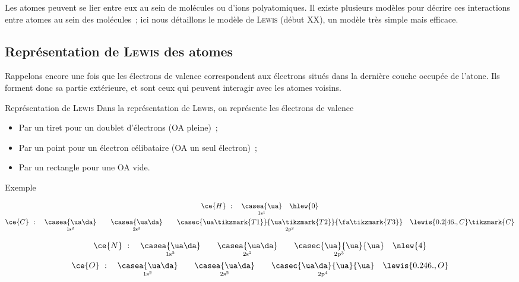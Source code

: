 \documentclass[../main/main.tex]{subfiles}
\begin{document}
Les atomes peuvent se lier entre eux au sein de molécules ou d'ions
polyatomiques. Il existe plusieurs modèles pour décrire ces
interactions entre atomes au sein des molécules~; ici nous détaillons le modèle
de \textsc{Lewis} (début \textsc{XX}\ieme), un modèle très simple mais efficace.

\subsection{Représentation de \textsc{Lewis} des atomes}
Rappelons encore une fois que les électrons de valence correspondent aux
électrons situés dans la dernière couche occupée de l'atone.
Ils forment donc sa partie extérieure, et sont ceux qui peuvent interagir avec
les atomes voisins.

\begin{tdefi}{Représentation de \textsc{Lewis}}
    Dans la représentation de \textsc{Lewis}, on représente les électrons de
    valence
    \begin{itemize}
        \item Par un tiret pour un doublet d'électrons (OA pleine)~;
        \item Par un point pour un électron célibataire (OA un seul électron)~;
        \item Par un rectangle pour une OA vide.
    \end{itemize}
\end{tdefi}

\begin{rexem}{Exemple}
    \begin{minipage}{0.48\linewidth}
        \begin{gather*}
            \ce{H}~:
            \quad
            \underset{\rm 1s^1}{\casea{\ua}}
            \quad
            \hlew{0}
            \\
            \ce{C}~:
            \quad
            \underset{\rm 1s^2}{\casea{\ua\da}}
            \qquad
            \underset{\rm 2s^2}{\casea{\ua\da}}
            \qquad
            \underset{\rm
            2p^2}{\casec{\ua\tikzmark{T1}}{\ua\tikzmark{T2}}{\fa\tikzmark{T3}}}
            \quad
            \lewis{0.2|46.,C}\tikzmark{C}
        \end{gather*}
    \end{minipage}
    \hfill
    \begin{minipage}{0.48\linewidth}
        \begin{gather*}
            \ce{N}~:
            \quad
            \underset{\rm 1s^2}{\casea{\ua\da}}
            \qquad
            \underset{\rm 2s^2}{\casea{\ua\da}}
            \qquad
            \underset{\rm 2p^3}{\casec{\ua}{\ua}{\ua}}
            \quad
            \nlew{4}
            \\
            \ce{O}~:
            \quad
            \underset{\rm 1s^2}{\casea{\ua\da}}
            \qquad
            \underset{\rm 2s^2}{\casea{\ua\da}}
            \qquad
            \underset{\rm 2p^4}{\casec{\ua\da}{\ua}{\ua}}
            \quad
            \lewis{0.246.,O}
        \end{gather*}
    \end{minipage}
\end{rexem}
\end{document}
